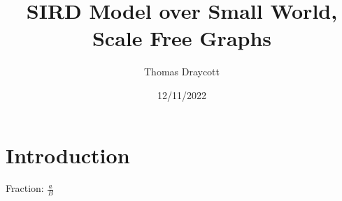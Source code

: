 \documentclass{article}
\title{SIRD Model over Small World, Scale Free Graphs}
\date{12/11/2022}
\author{Thomas Draycott}
\begin{document}
    \maketitle
    \newpage
    \section{Introduction}
    Fraction: $\frac{a}{B}$
    
    
    
\end{document}
